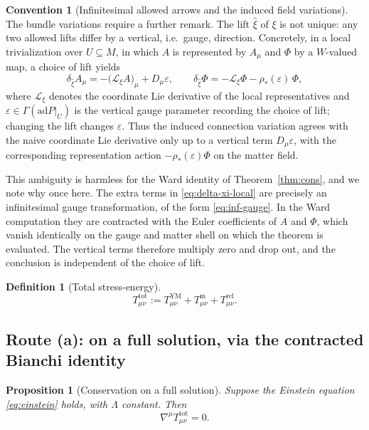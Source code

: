 \documentclass[11pt,a4paper]{article}
\theoremstyle{plain}
\newtheorem{proposition}[theorem]{Proposition}
\theoremstyle{definition}
\newtheorem{definition}[theorem]{Definition}
\newtheorem{convention}[theorem]{Convention}
\theoremstyle{remark}
\newcommand{\Lie}{\mathcal{L}}
\begin{document}
\begin{convention}[Infinitesimal allowed arrows and the induced field variations]
The bundle variations require a further remark. The lift $\hat\xi$ of $\xi$ is not unique: any two
allowed lifts differ by a vertical, i.e.\ gauge, direction. Concretely, in a local trivialization
over $U\subseteq M$, in which $A$ is represented by $A_\mu$ and $\Phi$ by a $W$-valued map, a choice
of lift yields
\begin{equation}
\label{eq:delta-xi-local}
\delta_{\hat\xi}A_\mu = -\bigl(\Lie_\xi A\bigr)_\mu + D_\mu\varepsilon,
\qquad
\delta_{\hat\xi}\Phi = -\Lie_\xi\Phi - \rho_*(\varepsilon)\,\Phi ,
\end{equation}
where $\Lie_\xi$ denotes the coordinate Lie derivative of the local representatives and
$\varepsilon\in\Gamma(\mathrm{ad}P|_U)$ is the vertical gauge parameter recording the choice of
lift; changing the lift changes $\varepsilon$. Thus the induced connection variation agrees with the
naive coordinate Lie derivative only up to a vertical term $D_\mu\varepsilon$, with the
corresponding representation action $-\rho_*(\varepsilon)\Phi$ on the matter field.

This ambiguity is harmless for the Ward identity of Theorem~\ref{thm:cons}, and we note why once
here. The extra terms in \eqref{eq:delta-xi-local} are precisely an infinitesimal gauge
transformation, of the form \eqref{eq:inf-gauge}. In the Ward computation they are contracted with
the Euler coefficients of $A$ and $\Phi$, which vanish identically on the gauge and matter shell on
which the theorem is evaluated. The vertical terms therefore multiply zero and drop out, and the
conclusion is independent of the choice of lift.
\end{convention}

\begin{definition}[Total stress-energy]
\label{def:Ttot}
\begin{equation}
\label{eq:Ttot}
T^{\mathrm{tot}}_{\mu\nu}
:=T^{\mathrm{YM}}_{\mu\nu}+T^{\mathrm{m}}_{\mu\nu}+T^{\mathrm{rel}}_{\mu\nu} .
\end{equation}
\end{definition}

\subsection{Route (a): on a full solution, via the contracted Bianchi identity}

\begin{proposition}[Conservation on a full solution]
\label{prop:cons-bianchi}
Suppose the Einstein equation \eqref{eq:einstein} holds, with $\Lambda$ constant. Then
\begin{equation}
\label{eq:cons-a}
\nabla^{\mu}T^{\mathrm{tot}}_{\mu\nu}=0 .
\end{equation}
\end{proposition}
\end{document}
